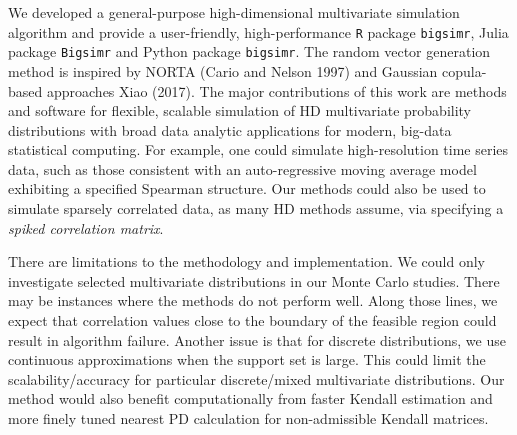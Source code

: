 \documentclass{article}
\begin{document}
We developed a general-purpose high-dimensional multivariate simulation
algorithm and provide a user-friendly, high-performance \texttt{R}
package \texttt{bigsimr}, Julia package \texttt{Bigsimr} and Python
package \texttt{bigsimr}. The random vector generation method is
inspired by NORTA (Cario and Nelson 1997) and Gaussian copula-based
approaches Xiao (2017). The major contributions of this work are methods
and software for flexible, scalable simulation of HD multivariate
probability distributions with broad data analytic applications for
modern, big-data statistical computing. For example, one could simulate
high-resolution time series data, such as those consistent with an
auto-regressive moving average model exhibiting a specified Spearman
structure. Our methods could also be used to simulate sparsely
correlated data, as many HD methods assume, via specifying a
\emph{spiked correlation matrix}.

There are limitations to the methodology and implementation. We could
only investigate selected multivariate distributions in our Monte Carlo
studies. There may be instances where the methods do not perform well.
Along those lines, we expect that correlation values close to the
boundary of the feasible region could result in algorithm failure.
Another issue is that for discrete distributions, we use continuous
approximations when the support set is large. This could limit the
scalability/accuracy for particular discrete/mixed multivariate
distributions. Our method would also benefit computationally from faster
Kendall estimation and more finely tuned nearest PD calculation for
non-admissible Kendall matrices.
\end{document}
